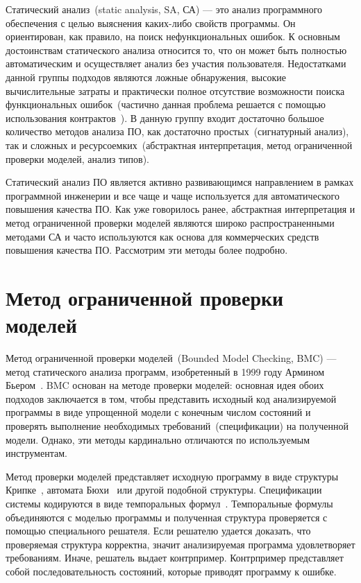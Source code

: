 Статический анализ~(static analysis, SA, СА) --- это анализ программного 
обеспечения с целью выяснения 
каких-либо свойств программы. Он ориентирован, как правило, на поиск
нефункциональных ошибок. К основным достоинствам статического анализа
относится то, что он может быть полностью автоматическим и осуществляет 
анализ без участия пользователя. Недостатками данной группы подходов
являются ложные обнаружения, высокие вычислительные затраты и практически полное
отсутствие возможности поиска функциональных ошибок~(частично данная проблема 
решается с помощью использования контрактов~\cite{designByContract}). В данную
группу входит достаточно большое количество методов анализа ПО, как достаточно
простых~(сигнатурный анализ), так и сложных и ресурсоемких~(абстрактная 
интерпретация, метод ограниченной проверки моделей, анализ типов).

Статический анализ ПО является активно развивающимся направлением в рамках
программной инженерии и все чаще и чаще используется для автоматического 
повышения качества ПО. Как уже говорилось ранее, абстрактная интерпретация и 
метод ограниченной проверки моделей являются широко распространенными 
методами СА и часто используются как основа для коммерческих средств
повышения качества ПО. Рассмотрим эти методы более подробно.

\section{Метод ограниченной проверки моделей}

Метод ограниченной проверки моделей~(Bounded Model Checking, BMC) --- метод
статического анализа программ, изобретенный в 1999 году Армином 
Бьером~\cite{symbolicModelChecking}.
BMC основан на методе проверки моделей: основная идея обоих подходов заключается
в том, чтобы представить исходный код анализируемой программы в виде упрощенной
модели с конечным числом состояний и проверять 
выполнение необходимых требований~(спецификации) на полученной модели. Однако, 
эти методы кардинально отличаются по используемым инструментам.

Метод проверки моделей представляет исходную программу в виде структуры 
Крипке~\cite{kripkeModel}, автомата Бюхи~\cite{buchiAutomata} или другой 
подобной структуры. Спецификации системы кодируются в виде темпоральных 
формул~\cite{temporalLogic}. Темпоральные формулы объединяются с моделью программы 
и полученная структура проверяется с помощью специального решателя. 
Если решателю удается доказать, что проверяемая структура корректна, 
значит анализируемая программа удовлетворяет требованиям. Иначе, решатель выдает
контрпример. Контрпример представляет собой последовательность состояний,
которые приводят программу к ошибке.


